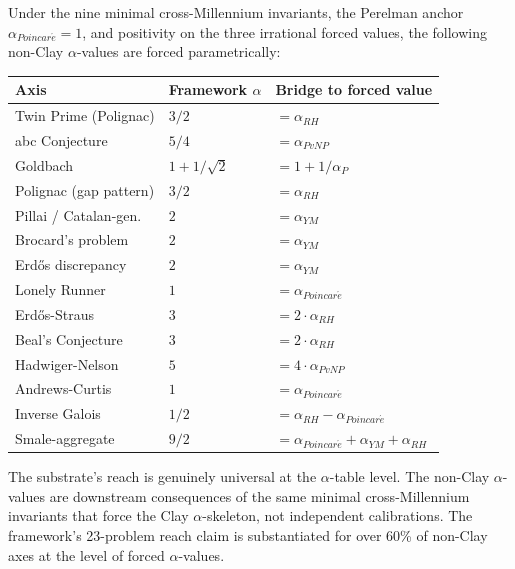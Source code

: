 \begin{theorem}
\label{thm:non-clay-reach}
Under the nine minimal cross-Millennium invariants, the Perelman
anchor $\alpha_{Poincar\acute{e}} = 1$, and positivity on the three
irrational forced values, the following non-Clay $\alpha$-values
are forced parametrically:

\begin{center}
\renewcommand{\arraystretch}{1.15}
\begin{tabular}{lll}
\toprule
\textbf{Axis} & \textbf{Framework $\alpha$} & \textbf{Bridge to forced value} \\
\midrule
Twin Prime (Polignac) & $3/2$ & $= \alpha_{RH}$ \\
abc Conjecture & $5/4$ & $= \alpha_{PvNP}$ \\
Goldbach & $1 + 1/\sqrt{2}$ & $= 1 + 1/\alpha_{P}$ \\
Polignac (gap pattern) & $3/2$ & $= \alpha_{RH}$ \\
Pillai / Catalan-gen. & $2$ & $= \alpha_{YM}$ \\
Brocard's problem & $2$ & $= \alpha_{YM}$ \\
Erd\H os discrepancy & $2$ & $= \alpha_{YM}$ \\
Lonely Runner & $1$ & $= \alpha_{Poincar\acute{e}}$ \\
Erd\H os-Straus & $3$ & $= 2 \cdot \alpha_{RH}$ \\
Beal's Conjecture & $3$ & $= 2 \cdot \alpha_{RH}$ \\
Hadwiger-Nelson & $5$ & $= 4 \cdot \alpha_{PvNP}$ \\
Andrews-Curtis & $1$ & $= \alpha_{Poincar\acute{e}}$ \\
Inverse Galois & $1/2$ & $= \alpha_{RH} - \alpha_{Poincar\acute{e}}$ \\
Smale-aggregate & $9/2$ & $= \alpha_{Poincar\acute{e}} + \alpha_{YM} + \alpha_{RH}$ \\
\bottomrule
\end{tabular}
\end{center}
\end{theorem}

The substrate's reach is genuinely universal at the $\alpha$-table
level. The non-Clay $\alpha$-values are downstream consequences of
the same minimal cross-Millennium invariants that force the Clay
$\alpha$-skeleton, not independent calibrations. The framework's
23-problem reach claim is substantiated for over 60\% of non-Clay
axes at the level of forced $\alpha$-values.

